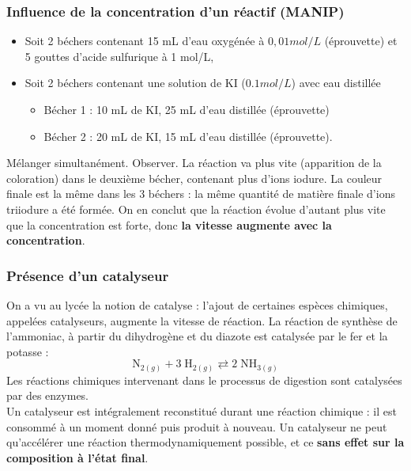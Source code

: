 \documentclass[11pt,a4paper]{report}
\begin{document}
\subsubsection{Influence de la concentration d'un réactif (MANIP)}

\begin{itemize}
	\item Soit 2 béchers contenant 15 mL d'eau oxygénée à $0,01 mol/L$ (éprouvette) et 5 gouttes 		d'acide sulfurique à 1 mol/L,
	\item Soit 2 béchers contenant une solution de KI ($0.1 mol/L$) avec eau distillée
		\begin{itemize}
			\item Bécher 1 : 10 mL de KI, 25 mL d'eau distillée (éprouvette)
			\item Bécher 2 : 20 mL de KI, 15 mL d'eau distillée (éprouvette). 
		\end{itemize}
\end{itemize}
Mélanger simultanément. Observer. La réaction va plus vite (apparition de la coloration) dans le deuxième bécher, contenant plus d'ions iodure. La couleur finale est la même dans les 3 béchers : la même quantité de matière finale d'ions triiodure a été formée. On en conclut que la réaction évolue d'autant plus vite que la concentration est forte, donc \textbf{la vitesse augmente avec la concentration}.

\subsubsection{Présence d'un catalyseur}

On a vu au lycée la notion de catalyse : l'ajout de certaines espèces chimiques, appelées catalyseurs, augmente la vitesse de réaction. La réaction de synthèse de l'ammoniac, à partir du dihydrogène et du diazote est catalysée par le fer et la potasse : 
\begin{equation}
	\text{N}_{2(g)} + 3\;\text{H}_{2(g)}  \rightleftarrows 2\;\text{NH}_{3(g)} 
\end{equation}
Les réactions chimiques intervenant dans le processus de digestion sont catalysées par des enzymes.\\

Un catalyseur est intégralement reconstitué durant une réaction chimique : il est consommé à un moment donné puis produit à nouveau. Un catalyseur ne peut qu'accélérer une réaction thermodynamiquement possible, et ce \textbf{sans effet sur la composition à l'état final}.
\end{document}
